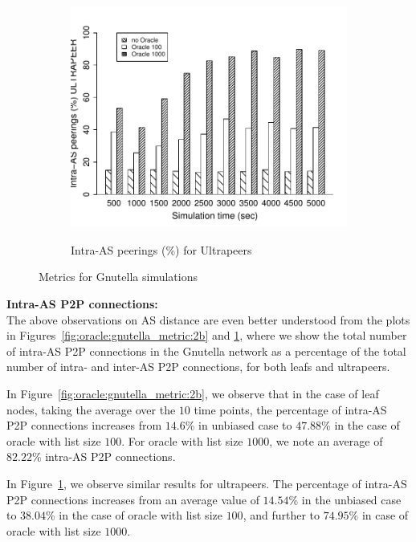 \begin{figure}[tbp]
 \hfill
    \begin{subfigure}[]{0.32\linewidth}
    {\includegraphics[width=1\textwidth]{figures-pdf/intraAS-up}}
    \caption{Intra-AS peerings (\%) for Ultrapeers\label{fig:oracle:gnutella_metric:2c}}
    \end{subfigure}
    \caption{Metrics for Gnutella simulations}
   \label{fig:oracle:gnutella_metric}
\end{figure}


\vspace{0.75\baselineskip}
\noindent\textbf{Intra-AS P2P connections:} \\
The above observations on AS distance are even better understood from the plots in
Figures~\ref{fig:oracle:gnutella_metric:2b} and \ref{fig:oracle:gnutella_metric:2c}, where we show the total number of intra-AS
P2P connections in the Gnutella network as a percentage of the total number of intra- and
inter-AS P2P connections, for both leafs and ultrapeers.

In Figure~\ref{fig:oracle:gnutella_metric:2b}, we observe that in the case of leaf nodes, taking
the average over the $10$ time points, the percentage of intra-AS P2P connections
increases from $14.6$\% in unbiased case to $47.88$\% in the case of oracle with list size
$100$. For oracle with list size $1000$, we note an average of $82.22$\% intra-AS P2P
connections.

In Figure~\ref{fig:oracle:gnutella_metric:2c}, we observe similar results for ultrapeers. The
percentage of intra-AS P2P connections increases from an average value of $14.54$\% in the
unbiased case to $38.04$\% in the case of oracle with list size $100$, and further to
$74.95$\% in case of oracle with list size $1000$.

